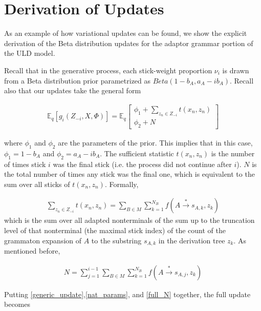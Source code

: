 

\section{Derivation of Updates}
\label{append_c}
As an example of how variational updates can be found, we show the explicit derivation of the Beta distribution updates for the adaptor grammar portion of the ULD model. 

Recall that in the generative process, each stick-weight proportion $\nu_i$ is drawn from a Beta distribution prior parametrized as $Beta(1-b_A, a_A - ib_A)$. Recall also that our updates take the general form 

\begin{align}
\label{generic_update}
\mathbb{E}_q[g_i(Z_{-i}, X, \Phi)] = \mathbb{E}_q \begin{bmatrix} \phi_1 + \sum\limits_{z_n \in Z_{-i}} t(x_n, z_n) \\ \phi_2 + N \end{bmatrix}
\end{align}

where $\phi_1$ and $\phi_2$ are the parameters of the prior. This implies that in this case, $\phi_1 = 1-b_A$ and $\phi_2 = a_A - ib_A$. The sufficient statistic $t(x_n, z_n)$ is the number of times stick $i$ was the final stick (i.e. the process did not continue after $i$). $N$ is the total number of times any stick was the final one, which is equivalent to the sum over all sticks of $t(x_n, z_n)$. Formally, 

\begin{align}
\label{nat_params}
\sum\limits_{z_n \in Z_{-i}} t(x_n, z_n) = \sum\limits_{B \in M} \sum\limits_{k=1}^{N_B} f(A \overset{*}{\rightarrow} s_{A,k}, z_k)
\end{align}
which is the sum over all adapted nonterminals of the sum up to the truncation level of that nonterminal (the maximal stick index) of the count of the grammaton expansion of $A$ to the substring $s_{A,k}$ in the derivation tree $z_k$. As mentioned before, 

\begin{align}
\label{full_N}
N = \sum\limits_{j=1}^{i-1} \sum\limits_{B \in M} \sum\limits_{k=1}^{N_B} f(A \overset{*}{\rightarrow} s_{A,j}, z_k)
\end{align}

Putting \eqref{generic_update},\eqref{nat_params}, and \eqref{full_N} together, the full update becomes 

